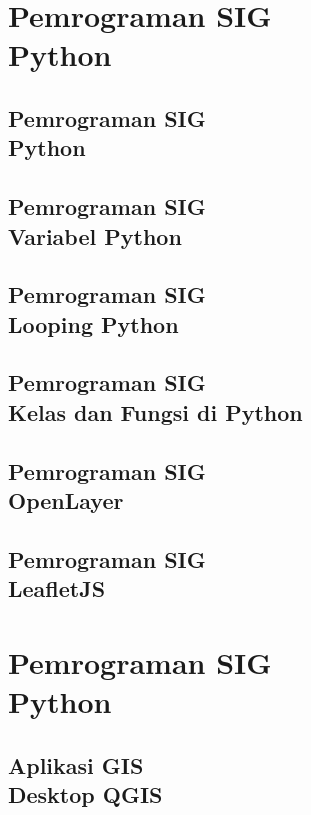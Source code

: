 \documentclass{WileySix}
\begin{document}
\part[Pemrograman SIG]
{Pemrograman SIG\\ Python}

\chapter[Python]
{Pemrograman SIG\\ Python}


\chapter[Variabel]
{Pemrograman SIG\\ Variabel Python}



\chapter[Looping]
{Pemrograman SIG\\ Looping Python}


\chapter[Kelas dan Fungsi di Python]
{Pemrograman SIG\\ Kelas dan Fungsi di Python}


\chapter[OpenLayer]
{Pemrograman SIG\\ OpenLayer}


\chapter[LeafletJS]
{Pemrograman SIG\\ LeafletJS}


\part[Aplikasi SIG]
{Pemrograman SIG\\ Python}

\chapter[QGIS]
{Aplikasi GIS\\ Desktop QGIS}








\printindex
\end{document}
